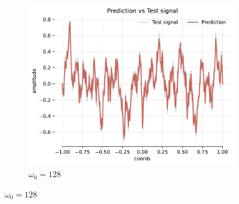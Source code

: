 \begin{figure}[h]
    \hfill
    \begin{subfigure}[b]{0.32\textwidth}
        \centering
        \includegraphics[width=\textwidth]{img/ch4/pred-noise-h0-w128.pdf}
        \caption{$\omega_0=128$}
        \label{fig:rec-noise-shallow-w128}
    \end{subfigure}


\end{figure}
